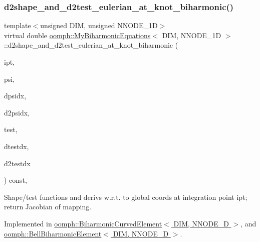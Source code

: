 \subsubsection{\texorpdfstring{d2shape\+\_\+and\+\_\+d2test\+\_\+eulerian\+\_\+at\+\_\+knot\+\_\+biharmonic()}{d2shape\_and\_d2test\_eulerian\_at\_knot\_biharmonic()}\hspace{0.1cm}{\footnotesize\ttfamily [1/2]}}
{\footnotesize\ttfamily template$<$unsigned D\+IM, unsigned N\+N\+O\+D\+E\+\_\+1D$>$ \\
virtual double \hyperlink{classoomph_1_1MyBiharmonicEquations}{oomph\+::\+My\+Biharmonic\+Equations}$<$ D\+IM, N\+N\+O\+D\+E\+\_\+1D $>$\+::d2shape\+\_\+and\+\_\+d2test\+\_\+eulerian\+\_\+at\+\_\+knot\+\_\+biharmonic (\begin{DoxyParamCaption}\item[{const unsigned \&}]{ipt,  }\item[{Shape \&}]{psi,  }\item[{D\+Shape \&}]{dpsidx,  }\item[{D\+Shape \&}]{d2psidx,  }\item[{Shape \&}]{test,  }\item[{D\+Shape \&}]{dtestdx,  }\item[{D\+Shape \&}]{d2testdx }\end{DoxyParamCaption}) const\hspace{0.3cm}{\ttfamily [protected]}, {}}



Shape/test functions and derivs w.\+r.\+t. to global coords at integration point ipt; return Jacobian of mapping. 



Implemented in \hyperlink{classoomph_1_1BiharmonicCurvedElement_a89720b99d24708f02135502625ad7e3c}{oomph\+::\+Biharmonic\+Curved\+Element$<$ D\+I\+M, N\+N\+O\+D\+E\+\_\+D $>$}, and \hyperlink{classoomph_1_1BellBiharmonicElement_aceea1798272378f0402ef0e0f324ff3b}{oomph\+::\+Bell\+Biharmonic\+Element$<$ D\+I\+M, N\+N\+O\+D\+E\+\_\+D $>$}.

\mbox{\label{classoomph_1_1MyBiharmonicEquations_a85687f39c0fb72f25ce67f5867a83470}} 
